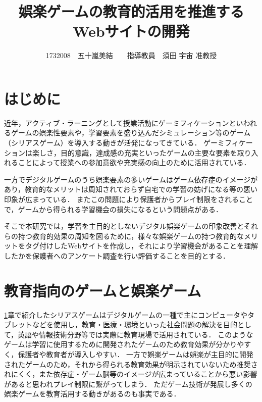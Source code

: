 \documentclass[twocolumn,10pt,a4j]{ltjsarticle}
\title{娯楽ゲームの教育的活用を推進するWebサイトの開発}
\author{1732008　五十嵐美結　　指導教員　須田 宇宙 准教授}
\date{}
\begin{document}
\maketitle

\section{はじめに}\label{introduction}

近年，アクティブ・ラーニングとして授業活動にゲーミフィケーションといわれるゲームの娯楽性要素や，学習要素を盛り込んだシミュレーション等のゲーム（シリアスゲーム）を導入する動きが活発になってきている．
ゲーミフィケーションは楽しさ，目的意識，達成感の充実といったゲームの主要な要素を取り入れることによって授業への参加意欲や充実感の向上のために活用されている．


一方でデジタルゲームのうち娯楽要素の多いゲームはゲーム依存症のイメージがあり，教育的なメリットは周知されておらず自宅での学習の妨げになる等の悪い印象が広まっている．
またこの問題により保護者からプレイ制限をされることで，ゲームから得られる学習機会の損失になるという問題点がある．

そこで本研究では，学習を主目的としないデジタル娯楽ゲームの印象改善とそれらの持つ教育的効果の周知を図るために，様々な娯楽ゲームの持つ教育的なメリットをタグ付けしたWebサイトを作成し，それにより学習機会があることを理解したかを保護者へのアンケート調査を行い評価することを目的とする．

\section{教育指向のゲームと娯楽ゲーム}

\ref{introduction}章で紹介したシリアスゲームはデジタルゲームの一種で主にコンピュータやタブレットなどを使用し，教育・医療・環境といった社会問題の解決を目的として，英語や情報技術分野等では実際に教育現場で活用されている．
このようなゲームは学習に使用するために開発されたゲームのため教育効果が分かりやすく，保護者や教育者が導入しやすい．
一方で娯楽ゲームは娯楽が主目的に開発されたゲームのため，それから得られる教育効果が明示されていないため推奨されにくく，また依存症・ゲーム脳等のイメージが広まっていることから悪い影響があると思われプレイ制限に繋がってしまう．
ただゲーム技術が発展し多くの娯楽ゲームを教育活用する動きがあるのも事実である．\cite{tvgame}
\end{document}
